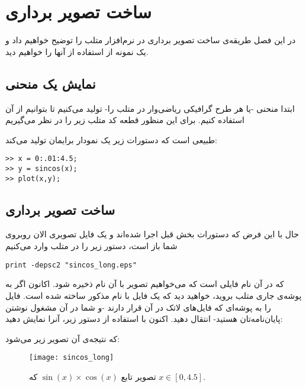 \chapter{ساخت تصویر برداری}
\begin{summary}
در این فصل طریقه‌ی ساخت تصویر برداری در نرم‌افزار متلب را توضیح خواهیم داد و یک نمونه از استفاده از آنها را خواهیم دید.
\end{summary}
\section{نمایش یک منحنی}
ابتدا منحنی -یا هر طرح گرافیکی ریاضی‌وار در متلب را- تولید می‌کنیم تا بتوانیم از آن استفاده کنیم. برای این منظور قطعه کد متلب زیر را در نظر می‌گیریم
\begin{latin}

\end{latin}
طبیعی است که دستورات زیر یک نمودار برایمان تولید می‌کند:
\begin{latin}
\begin{lstlisting}
>> x = 0:.01:4.5;
>> y = sincos(x);
>> plot(x,y);
\end{lstlisting}
\end{latin}

\section{ساخت تصویر برداری}
حال با این فرض که دستورات بخش قبل اجرا شده‌اند و یک فایل تصویری الان روبروی شما باز است، دستور زیر را در متلب وارد می‌کنیم
\begin{latin}
\begin{lstlisting}
print -depsc2 "sincos_long.eps"
\end{lstlisting}
\end{latin}
که در آن  نام فایلی است که می‌خواهیم تصویر با آن نام ذخیره شود. اکانون اگر به پوشه‌ی جاری متلب بروید، خواهید دید که یک فایل با نام مذکور ساخته شده است. فایل را به پوشه‌ای که فایل‌های لاتک در آن قرار دارند -و شما در آن مشغول نوشتن پایان‌نامه‌تان هستید- انتقال دهید. اکنون با استفاده از دستور زیر، آنرا نمایش دهید:
\begin{latin}

\end{latin}
که نتیجه‌ی آن تصویر زیر می‌شود:
\begin{figure}[!h]
\centerline{\texttt{[image: sincos\_long]}}
\caption{تصویر تابع $\sin(x)\times\cos(x)$ که $x\in[0,4.5]$.}
\label{fig:2:sincos_long}
\end{figure}